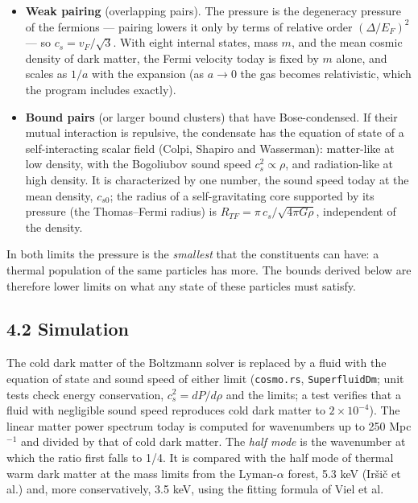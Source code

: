 \documentclass[
  10pt,
]{article}
\providecommand{\tightlist}{%
  \setlength{\itemsep}{0pt}\setlength{\parskip}{0pt}}
\begin{document}
\begin{itemize}
\tightlist
\item
  \textbf{Weak pairing} (overlapping pairs). The pressure is the
  degeneracy pressure of the fermions --- pairing lowers it only by
  terms of relative order \((\Delta/E_F)^2\) --- so \(c_s=v_F/\sqrt3\).
  With eight internal states, mass \(m\), and the mean cosmic density of
  dark matter, the Fermi velocity today is fixed by \(m\) alone, and
  scales as \(1/a\) with the expansion (as \(a\to0\) the gas becomes
  relativistic, which the program includes exactly).
\item
  \textbf{Bound pairs} (or larger bound clusters) that have
  Bose-condensed. If their mutual interaction is repulsive, the
  condensate has the equation of state of a self-interacting scalar
  field (Colpi, Shapiro and Wasserman): matter-like at low density, with
  the Bogoliubov sound speed \(c_s^2\propto\rho\), and radiation-like at
  high density. It is characterized by one number, the sound speed today
  at the mean density, \(c_{s0}\); the radius of a self-gravitating core
  supported by its pressure (the Thomas--Fermi radius) is
  \(R_{TF}=\pi\,c_s/\sqrt{4\pi G\rho}\), independent of the density.
\end{itemize}

In both limits the pressure is the \emph{smallest} that the constituents
can have: a thermal population of the same particles has more. The
bounds derived below are therefore lower limits on what any state of
these particles must satisfy.

\hypertarget{simulation}{%
\subsection{4.2 Simulation}\label{simulation}}

The cold dark matter of the Boltzmann solver is replaced by a fluid with
the equation of state and sound speed of either limit
(\texttt{cosmo.rs}, \texttt{SuperfluidDm}; unit tests check energy
conservation, \(c_s^2=dP/d\rho\) and the limits; a test verifies that a
fluid with negligible sound speed reproduces cold dark matter to
\(2\times10^{-4}\)). The linear matter power spectrum today is computed
for wavenumbers up to 250 Mpc\(^{-1}\) and divided by that of cold dark
matter. The \emph{half mode} is the wavenumber at which the ratio first
falls to 1/4. It is compared with the half mode of thermal warm dark
matter at the mass limits from the Lyman-\(\alpha\) forest, 5.3 keV
(Iršič et al.) and, more conservatively, 3.5 keV, using the fitting
formula of Viel et al.
\end{document}
